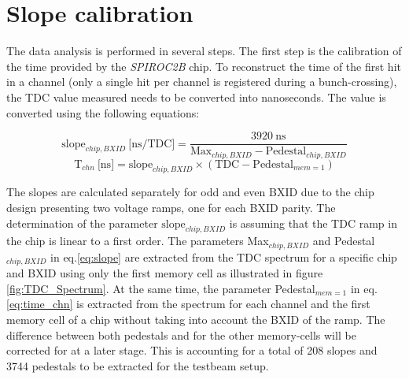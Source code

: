 \section{Slope calibration}
\label{subsec:slope_calib}

The data analysis is performed in several steps. The first step is the calibration of the time provided by the \textit{SPIROC2B} chip. To reconstruct the time of the first hit in a channel (only a single hit per channel is registered during a bunch-crossing), the TDC value measured needs to be converted into nanoseconds. The value is converted using the following equations:

\begin{equation} \label{eq:slope}
	\text{slope}_{chip, BXID} \: \text{[ns/TDC]} = \frac{3920 \: \text{ns}}{\text{Max}_{chip, BXID} - \text{Pedestal}_{chip, BXID}}
\end{equation}
\begin{equation} \label{eq:time_chn}
	\text{T}_{chn} \: \text{[ns]} = \text{slope}_{chip, BXID} \times (\text{TDC} - \text{Pedestal}_{mem=1} )
\end{equation}

The slopes are calculated separately for odd and even BXID due to the chip design presenting two voltage ramps, one for each BXID parity. The determination of the parameter $\text{slope}_{chip, BXID}$ is assuming that the TDC ramp in the chip is linear to a first order. The parameters Max$_{chip, BXID}$ and Pedestal$_{chip, BXID}$ in eq.\ref{eq:slope} are extracted from the TDC spectrum for a specific chip and BXID using only the first memory cell as illustrated in figure \ref{fig:TDC_Spectrum}. At the same time, the parameter Pedestal$_{mem=1}$ in eq.\ref{eq:time_chn} is extracted from the spectrum for each channel and the first memory cell of a chip without taking into account the BXID of the ramp. The difference between both pedestals and for the other memory-cells will be corrected for at a later stage. This is accounting for a total of 208 slopes and 3744 pedestals to be extracted for the testbeam setup.

